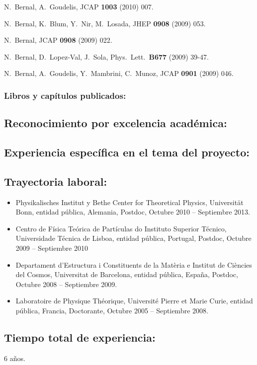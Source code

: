   N.~Bernal, A.~Goudelis,
  JCAP {\bf 1003 } (2010)  007.

  N.~Bernal, K.~Blum, Y.~Nir, M.~Losada,
  JHEP {\bf 0908 } (2009)  053.

  N.~Bernal,
  JCAP {\bf 0908 } (2009)  022.

  N.~Bernal, D.~Lopez-Val, J.~Sola,
  Phys.\ Lett.\  {\bf B677 } (2009)  39-47.

  N.~Bernal, A.~Goudelis, Y.~Mambrini, C.~Munoz,
  JCAP {\bf 0901 } (2009)  046.
\subsubsection{Libros y capítulos publicados:}
\subsection{Reconocimiento por excelencia académica:}
\subsection{Experiencia específica en el tema del proyecto:}
\subsection{Trayectoria laboral:}
\begin{itemize}
\item Physikalisches Institut y Bethe Center for Theoretical Physics, Universität Bonn, entidad pública, Alemania, Postdoc, Octubre 2010 -- Septiembre 2013.
\item Centro de Física Teórica de Partículas do Instituto Superior Técnico, Universidade Técnica de Lisboa, entidad pública, Portugal, Postdoc, Octubre 2009 -- Septiembre 2010
\item Departament d'Estructura i Constituents de la Matèria e Institut de Ciències del Cosmos, Universitat de Barcelona, entidad pública, España, Postdoc, Octubre 2008 -- Septiembre 2009.
\item Laboratoire de Physique Théorique, Université Pierre et Marie Curie, entidad pública, Francia, Doctorante, Octubre 2005 -- Septiembre 2008.
\end{itemize}
\subsection{Tiempo total de experiencia:}
6 años.


